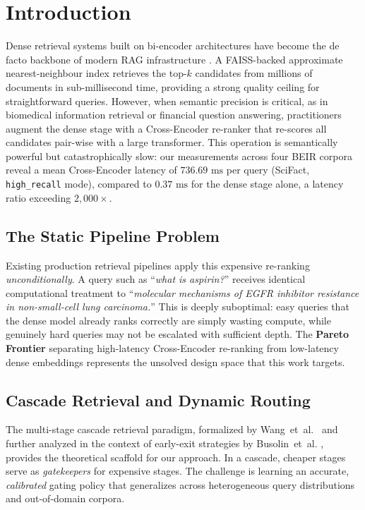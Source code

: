 \documentclass[journal]{IEEEtran}
\begin{document}
\section{Introduction}
\label{sec:intro}
Dense retrieval systems built on bi-encoder architectures have
become the de facto backbone of modern RAG infrastructure
\cite{karpukhin2020dense,reimers2019sentence}. A FAISS-backed
approximate nearest-neighbour index retrieves the top-$k$
candidates from millions of documents in sub-millisecond time,
providing a strong quality ceiling for straightforward queries.
However, when semantic precision is critical, as in biomedical
information retrieval or financial question answering, practitioners
augment the dense stage with a Cross-Encoder re-ranker that
re-scores all candidates pair-wise with a large transformer.
This operation is semantically powerful but catastrophically slow:
our measurements across four BEIR corpora reveal a mean
Cross-Encoder latency of $736.69\text{ ms}$ per query (SciFact,
\texttt{high\_recall} mode), compared to $0.37\text{ ms}$ for the
dense stage alone, a latency ratio exceeding $2{,}000\times$.

\subsection{The Static Pipeline Problem}

Existing production retrieval pipelines apply this expensive
re-ranking \emph{unconditionally}. A query such as ``\textit{what
is aspirin?}'' receives identical computational treatment to
``\textit{molecular mechanisms of EGFR inhibitor resistance in
non-small-cell lung carcinoma.}'' This is deeply suboptimal:
easy queries that the dense model already ranks correctly are
simply wasting compute, while genuinely hard queries may not be
escalated with sufficient depth. The \textbf{Pareto Frontier}
separating high-latency Cross-Encoder re-ranking from low-latency
dense embeddings represents the unsolved design space that this
work targets.

\subsection{Cascade Retrieval and Dynamic Routing}

The multi-stage cascade retrieval paradigm, formalized by
Wang~et~al.~\cite{wang2011cascade} and further analyzed in the
context of early-exit strategies by Busolin~et~al.
\cite{busolin2022earlyexit}, provides the theoretical scaffold for
our approach. In a cascade, cheaper stages serve as \emph{gatekeepers}
for expensive stages. The challenge is learning an accurate,
\emph{calibrated} gating policy that generalizes across heterogeneous
query distributions and out-of-domain corpora.
\end{document}
